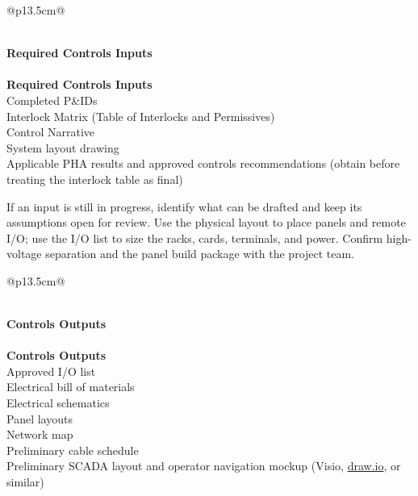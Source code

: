 \begin{longtable}{@{}p{13.5cm}@{}}
\caption{Stage 4 --- Required Controls Inputs}\label{tab:stage4-inputs} \\
\toprule
{}\textbf{Required Controls Inputs} \\
\midrule
\endfirsthead
{} \\
\toprule
{}\textbf{Required Controls Inputs} \\
\midrule
\endhead
Completed P\&IDs \\
Interlock Matrix (Table of Interlocks and Permissives) \\
Control Narrative \\
System layout drawing \\
Applicable PHA results and approved controls recommendations (obtain before treating the interlock table as final) \\
\bottomrule
\end{longtable}

If an input is still in progress, identify what can be drafted and keep its assumptions open for review. Use the physical layout to place panels and remote I/O; use the I/O list to size the racks, cards, terminals, and power. Confirm high-voltage separation and the panel build package with the project team.

\begin{longtable}{@{}p{13.5cm}@{}}
\caption{Stage 4 --- Controls Outputs}\label{tab:stage4-outputs} \\
\toprule
{}\textbf{Controls Outputs} \\
\midrule
\endfirsthead
{} \\
\toprule
{}\textbf{Controls Outputs} \\
\midrule
\endhead
Approved I/O list \\
Electrical bill of materials \\
Electrical schematics \\
Panel layouts \\
Network map \\
Preliminary cable schedule \\
Preliminary SCADA layout and operator navigation mockup (Visio, \href{https://www.drawio.com/}{draw.io}, or similar) \\
\bottomrule
\end{longtable}

